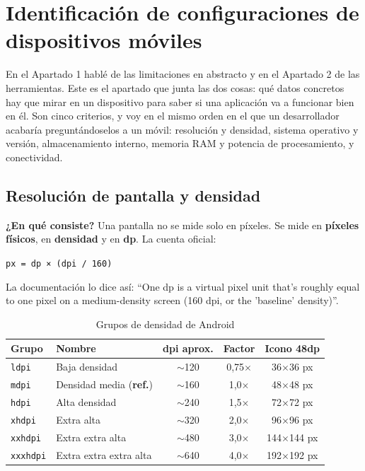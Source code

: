 \documentclass[11pt,a4paper]{article}
\newcommand{\code}[1]{\texttt{\color{ink}#1}}
\newcommand{\campo}[1]{\textbf{\color{ink}#1}}
\begin{document}
	\section{Identificación de configuraciones de dispositivos móviles}
	
	En el Apartado 1 hablé de las limitaciones en abstracto y en el Apartado 2 de las herramientas. Este es el apartado que junta las dos cosas: qué datos concretos hay que mirar en un dispositivo para saber si una aplicación va a funcionar bien en él. Son cinco criterios, y voy en el mismo orden en el que un desarrollador acabaría preguntándoselos a un móvil: resolución y densidad, sistema operativo y versión, almacenamiento interno, memoria RAM y potencia de procesamiento, y conectividad.
	
	\subsection{Resolución de pantalla y densidad}
	
	\campo{¿En qué consiste?}
	Una pantalla no se mide solo en píxeles. Se mide en \textbf{píxeles físicos}, en \textbf{densidad} y en \textbf{dp}. La cuenta oficial:
	\begin{center}\code{px = dp × (dpi / 160)}\end{center}
	La documentación lo dice así: \enquote{One dp is a virtual pixel unit that's roughly equal to one pixel on a medium-density screen (160 dpi, or the 'baseline' density)}.
	
	\begin{table}[htbp]
		\centering
		\small
		\begin{tabular}{@{}l l c c c@{}}
			\toprule
			\rowcolor{primary}
			\textcolor{paper}{\sffamily\bfseries Grupo} & \textcolor{paper}{\sffamily\bfseries Nombre} & \textcolor{paper}{\sffamily\bfseries dpi aprox.} & \textcolor{paper}{\sffamily\bfseries Factor} & \textcolor{paper}{\sffamily\bfseries Icono 48dp} \\
			\midrule
			\code{ldpi} & Baja densidad & $\sim$120 & 0,75$\times$ & 36$\times$36 px \\
			\rowcolor{soft}
			\code{mdpi} & Densidad media (\textbf{ref.}) & $\sim$160 & 1,0$\times$ & 48$\times$48 px \\
			\code{hdpi} & Alta densidad & $\sim$240 & 1,5$\times$ & 72$\times$72 px \\
			\rowcolor{soft}
			\code{xhdpi} & Extra alta & $\sim$320 & 2,0$\times$ & 96$\times$96 px \\
			\code{xxhdpi} & Extra extra alta & $\sim$480 & 3,0$\times$ & 144$\times$144 px \\
			\rowcolor{soft}
			\code{xxxhdpi} & Extra extra extra alta & $\sim$640 & 4,0$\times$ & 192$\times$192 px \\
			\bottomrule
		\end{tabular}
		\caption{Grupos de densidad de Android}
	\end{table}
	
\end{document}
